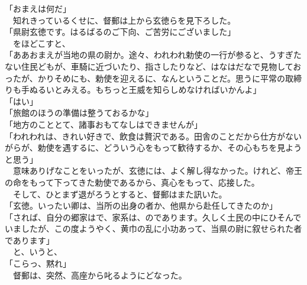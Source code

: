 \documentclass[
  paper=a5,
  fontsize=10pt,
  jafontsize=9.5pt,
  tate,                  %
  open_bracket_pos=nibu, %
]{jlreq}
\begin{document}
「おまえは何だ」\\


　知れきっているくせに、督郵は上から玄徳らを見下ろした。\\


「県尉玄徳です。はるばるのご下向、ご苦労にございました」\\


　をほどこすと、\\


「ああおまえが当地の県の尉か。途々、われわれ勅使の一行が参ると、うすぎたない住民どもが、車騎に近づいたり、指さしたりなど、はなはだなで見物しておったが、かりそめにも、勅使を迎えるに、なんということだ。思うに平常の取締りも手ぬるいとみえる。もちっと王威を知らしめなければいかんよ」\\


「はい」\\


「旅館のほうの準備は整うておるかな」\\


「地方のこととて、諸事おもてなしはできませんが」\\


「われわれは、きれい好きで、飲食は贅沢である。田舎のことだから仕方がないがらが、勅使を遇するに、どういう心をもって歓待するか、その心もちを見ようと思う」\\


　意味ありげなことをいったが、玄徳には、よく解し得なかった。けれど、帝王の命をもって下ってきた勅使であるから、真心をもって、応接した。\\


　そして、ひとまず退がろうとすると、督郵はまた訊いた。\\


「玄徳。いったい卿は、当所の出身の者か、他県から赴任してきたのか」\\


「されば、自分の郷家はで、家系は、のであります。久しく土民の中にひそんでいましたが、この度ようやく、黄巾の乱に小功あって、当県の尉に叙せられた者であります」\\


　と、いうと、\\


「こらっ、黙れ」\\


　督郵は、突然、高座から叱るようにどなった。\\
\end{document}
